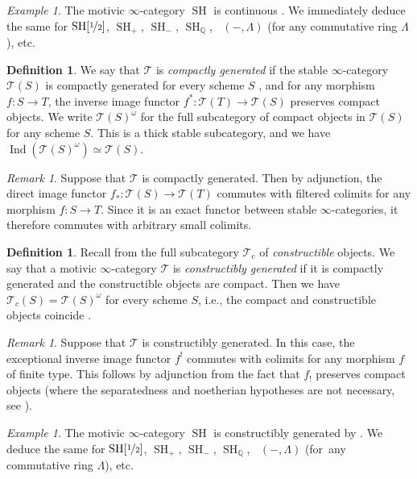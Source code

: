 \documentclass[11pt]{article}
\newcommand{\ie}{i.e.,\xspace}
\numberwithin{equation}{section}\renewcommand{\encodingdefault}{TU}
\newcommand{\T}{\mathscr T}
\renewcommand{\AA}{\mathbb A}
\DeclareMathOperator{\SH}{SH}
\DeclareMathOperator{\DA}{D_{\AA^1}}
\DeclareMathOperator{\Ind}{Ind}
\newcommand{\ot} {{\nicefrac 1 2}}
\newcommand{\QQ} {\mathbb Q}
\theoremstyle{remark}
\newtheorem{rem}[thm]{Remark}
\newtheorem{ex}[thm]{Example}
\theoremstyle{definition}
\newtheorem{df}[thm]{Definition}
\numberwithin{equation}{thm}
\begin{document}
\begin{ex}\label{ex:continuous}
The motivic $\infty$-category $\SH$ is continuous \cite[Prop.\,C.12(4)]{HoyoisLefschetz}.
We immediately deduce the same for $\SH[\ot]$, $\SH_+$, $\SH_-$, $\SH_\QQ$, $\DA(-,\Lambda)$ (for any commutative ring $\Lambda$), etc.
\end{ex}

\begin{df}
We say that $\T$ is \emph{compactly generated} if the stable $\infty$-category $\T(S)$ is compactly generated for every scheme $S$ \cite[Def.\,5.5.7.1]{LurieHTT}, and for any morphism $f : S \to T$, the inverse image functor $f^* : \T(T) \to \T(S)$ preserves compact objects.
We write $\T(S)^\omega$ for the full subcategory of compact objects in $\T(S)$ for any scheme $S$.
This is a thick stable subcategory, and we have $\Ind(\T(S)^\omega) \simeq \T(S)$.
\end{df}

\begin{rem}\label{rem:f_* colimits}
Suppose that $\T$ is compactly generated.
Then by adjunction, the direct image functor $f_* : \T(S) \to \T(T)$ commutes with filtered colimits for any morphism $f : S \to T$.
Since it is an exact functor between stable $\infty$-categories, it therefore commutes with arbitrary small colimits.
\end{rem}

\begin{df}\label{df:constructibly generated}
Recall from \cite[Def.\,4.2.1]{CD3} the full subcategory $\T_{\mathrm{c}}$ of \emph{constructible} objects.
We say that a motivic $\infty$-category $\T$ is \emph{constructibly generated} if it is compactly generated and the constructible objects are compact.
Then we have $\T_c(S) = \T(S)^\omega$ for every scheme $S$, \ie the compact and constructible objects coincide \cite[Prop.\,1.4.11]{CD3}.
\end{df}

\begin{rem}\label{rem:f_! constructibles}
Suppose that $\T$ is constructibly generated.
In this case, the exceptional inverse image functor $f^!$ commutes with colimits for any morphism $f$ of finite type.
This follows by adjunction from the fact that $f_!$ preserves compact objects \cite[Cor.\,4.2.12]{CD3} (where the separatedness and noetherian hypotheses are not necessary, see \cite[Cor.\,2.62]{KhanSix}).
\end{rem}

\begin{ex}
The motivic $\infty$-category $\SH$ is constructibly generated by \cite[Prop.\,C.12(1-3)]{HoyoisLefschetz}.
We deduce the same for $\SH[\ot]$, $\SH_+$, $\SH_-$, $\SH_\QQ$, $\DA(-,\Lambda)$ (for~any commutative ring $\Lambda$), etc.
\end{ex}
\end{document}
